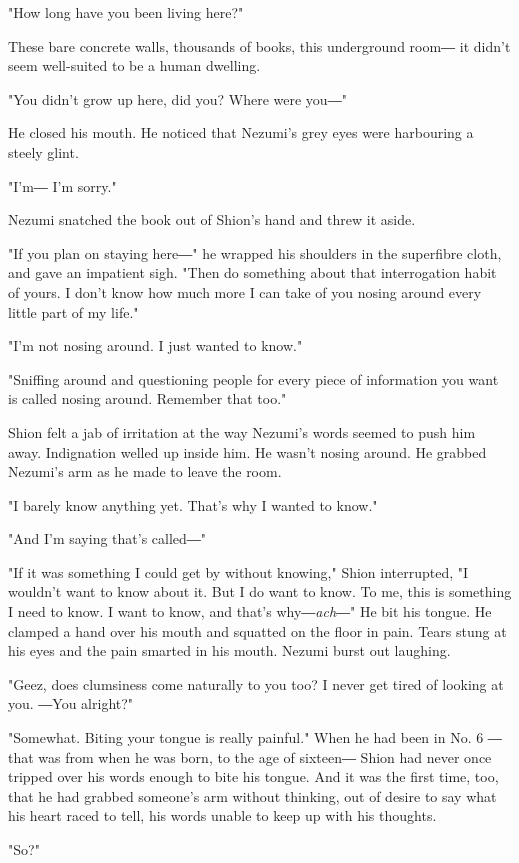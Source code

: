 "How long have you been living here?"

These bare concrete walls, thousands of books, this underground room― it
didn't seem well-suited to be a human dwelling.

"You didn't grow up here, did you? Where were you―"

He closed his mouth. He noticed that Nezumi's grey eyes were harbouring
a steely glint.

"I'm― I'm sorry."

Nezumi snatched the book out of Shion's hand and threw it aside.

"If you plan on staying here―" he wrapped his shoulders in the
superfibre cloth, and gave an impatient sigh. "Then do something about
that interrogation habit of yours. I don't know how much more I can take
of you nosing around every little part of my life."

"I'm not nosing around. I just wanted to know."

"Sniffing around and questioning people for every piece of information
you want is called nosing around. Remember that too."

Shion felt a jab of irritation at the way Nezumi's words seemed to push
him away. Indignation welled up inside him. He wasn't nosing around. He
grabbed Nezumi's arm as he made to leave the room.

"I barely know anything yet. That's why I wanted to know."

"And I'm saying that's called―"

"If it was something I could get by without knowing," Shion interrupted,
"I wouldn't want to know about it. But I do want to know. To me, this is
something I need to know. I want to know, and that's why―\emph{ach}―" He bit
his tongue. He clamped a hand over his mouth and squatted on the floor
in pain. Tears stung at his eyes and the pain smarted in his mouth.
Nezumi burst out laughing.

"Geez, does clumsiness come naturally to you too? I never get tired of
looking at you. ―You alright?"

"Somewhat. Biting your tongue is really painful." When he had been in
No. 6 ― that was from when he was born, to the age of sixteen― Shion had
never once tripped over his words enough to bite his tongue. And it was
the first time, too, that he had grabbed someone's arm without thinking,
out of desire to say what his heart raced to tell, his words unable to
keep up with his thoughts.

"So?"

